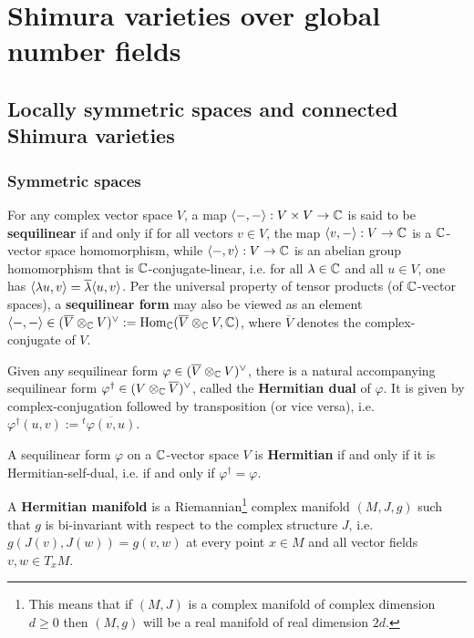 \section{Shimura varieties over global number fields}
    \subsection{Locally symmetric spaces and connected Shimura varieties}
        \subsubsection{Symmetric spaces}
            \begin{definition} \label{def: sequilinear_forms}
                For any complex vector space $V$, a map $\<-,-\>: V \x V \to \bbC$ is said to be \textbf{sequilinear} if and only if for all vectors $v \in V$, the map $\langle v, -\rangle: V \to \mathbb{C}$ is a $\mathbb{C}$-vector space homomorphism, while $\langle-, v\rangle: V \to \mathbb{C}$ is an abelian group homomorphism that is $\mathbb{C}$-conjugate-linear, i.e. for all $\lambda \in \mathbb{C}$ and all $u \in V$, one has $\langle\lambda u, v\rangle = \overline{\lambda} \langle u, v\rangle$. Per the universal property of tensor products (of $\mathbb{C}$-vector spaces), a \textbf{sequilinear form} may also be viewed as an element $\<-,-\> \in (\overline{V} \tensor_{\bbC} V)^{\vee} := \Hom_{\bbC}(\overline{V} \tensor_{\bbC} V, \bbC)$, where $\overline{V}$ denotes the complex-conjugate of $V$.
            \end{definition}
            \begin{remark}
                Given any sequilinear form $\varphi \in (\overline{V} \tensor_{\bbC} V)^{\vee}$, there is a natural accompanying sequilinear form $\varphi^{\dagger} \in (V \tensor_{\bbC} \overline{V})^{\vee}$, called the \textbf{Hermitian dual} of $\varphi$. It is given by complex-conjugation followed by transposition (or vice versa), i.e. $\varphi^{\dagger}(u, v) := {}^t\overline{\varphi(v, u)}$.
            \end{remark}
            \begin{definition} \label{def: hermitian_forms}
                A sequilinear form $\varphi$ on a $\mathbb{C}$-vector space $V$ is \textbf{Hermitian} if and only if it is Hermitian-self-dual, i.e. if and only if $\varphi^{\dagger} = \varphi$.
            \end{definition}
            \begin{definition} \label{def: hermitian_manifolds}
                A \textbf{Hermitian manifold} is a Riemannian\footnote{This means that if $(M, J)$ is a complex manifold of complex dimension $d \geq 0$ then $(M, g)$ will be a real manifold of real dimension $2d$.} complex manifold $(M, J, g)$ such that $g$ is bi-invariant with respect to the complex structure $J$, i.e. $g(J(v), J(w)) = g(v, w)$ at every point $x \in M$ and all vector fields $v, w \in T_xM$.
            \end{definition}
            
